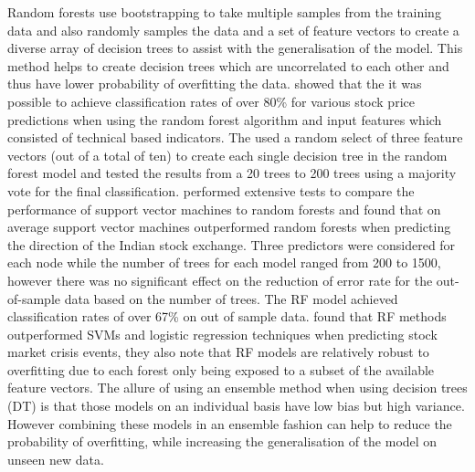 \documentclass[12pt, a4paper]{article}
\begin{document}
 Random forests use bootstrapping to take multiple samples from the training data and also randomly samples the data and a set of feature vectors to create a diverse array of decision trees to assist with the generalisation of the model. This method helps to create decision trees which are uncorrelated to each other and thus have lower probability of overfitting the data.\cite{Patel2014} showed that the it was possible to achieve classification rates of over 80\% for various stock price predictions when using the random forest algorithm and input features which consisted of technical based indicators. The used a random select of three feature vectors (out of a total of ten) to create each single decision tree in the random forest model and tested the results from a 20 trees to 200 trees using a majority vote for the final classification.  \newline
\cite{Kumar2006} performed extensive tests to compare the performance of support vector machines to random forests and found that on average support vector machines outperformed random forests when predicting the direction of the Indian stock exchange.  Three predictors were considered for each node while the number of trees for each model ranged from 200 to 1500, however there was no significant effect on the reduction of error rate for the out-of-sample data based on the number of trees. The RF model achieved classification rates of over 67\% on out of sample data.\newline
\cite{Chatzis} found that RF methods outperformed SVMs and logistic regression techniques when predicting stock market crisis events, they also note that RF models are relatively robust to overfitting due to each forest only being exposed to a subset of the available feature vectors.
The allure of using an ensemble method when using decision trees (DT) is that those models on an individual basis have low bias but high variance. However combining these models in an ensemble fashion can help to reduce the probability of overfitting, while increasing the generalisation of the model on unseen new data.
 
\end{document}
